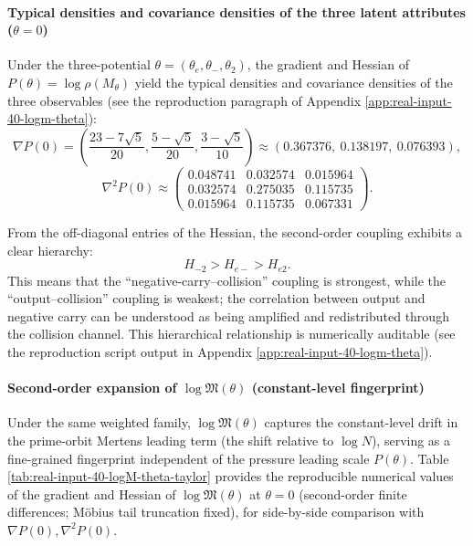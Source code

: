 \paragraph{Typical densities and covariance densities of the three latent attributes (\texorpdfstring{$\theta=0$}{theta=0})}
Under the three-potential $\theta=(\theta_e,\theta_-,\theta_2)$, the gradient and Hessian of $P(\theta)=\log\rho(M_\theta)$ yield the typical densities and covariance densities of the three observables (see the reproduction paragraph of Appendix \ref{app:real-input-40-logm-theta}):
\[
\nabla P(0)=\left(\frac{23-7\sqrt5}{20},\frac{5-\sqrt5}{20},\frac{3-\sqrt5}{10}\right)\approx(0.367376,\ 0.138197,\ 0.076393),
\]
\[
\nabla^2P(0)\approx
\begin{pmatrix}
0.048741 & 0.032574 & 0.015964\\
0.032574 & 0.275035 & 0.115735\\
0.015964 & 0.115735 & 0.067331
\end{pmatrix}.
\]
\begin{remark}
From the off-diagonal entries of the Hessian, the second-order coupling exhibits a clear hierarchy:
\[
H_{-2}>H_{e-}>H_{e2}.
\]
This means that the ``negative-carry--collision'' coupling is strongest, while the ``output--collision'' coupling is weakest; the correlation between output and negative carry can be understood as being amplified and redistributed through the collision channel. This hierarchical relationship is numerically auditable (see the reproduction script output in Appendix \ref{app:real-input-40-logm-theta}).
\end{remark}

\paragraph{Second-order expansion of \texorpdfstring{$\log\mathfrak{M}(\theta)$}{logM(theta)} (constant-level fingerprint)}
Under the same weighted family, $\log\mathfrak{M}(\theta)$ captures the constant-level drift in the prime-orbit Mertens leading term (the shift relative to $\log N$), serving as a fine-grained fingerprint independent of the pressure leading scale $P(\theta)$.
Table \ref{tab:real-input-40-logM-theta-taylor} provides the reproducible numerical values of the gradient and Hessian of $\log\mathfrak{M}(\theta)$ at $\theta=0$ (second-order finite differences; M\"{o}bius tail truncation fixed), for side-by-side comparison with $\nabla P(0),\nabla^2P(0)$.


